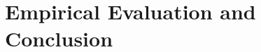 \documentclass[
    12pt,               %
    a4paper,            %
    twoside,            %
    openright,          %
    titlepage,          %
    fleqn,              %
    leqno,              %
    final               %
]{book}
\theoremstyle{definition}
\theoremstyle{plain}
\begin{document}
\part{Empirical Evaluation and Conclusion}






\backmatter

\begin{appendices}


\end{appendices}

\cleardoublepage
{}
{}
\printbibliography
\end{document}
